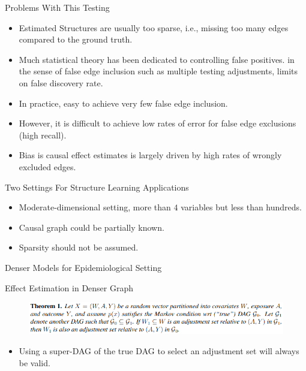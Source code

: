 \documentclass{beamer}
\begin{document}
\begin{frame}{Problems With This Testing}
	\begin{itemize}
		\item Estimated Structures are usually too sparse, i.e., missing too many edges compared to the ground truth.
		\item Much statistical theory has been dedicated to controlling false positives. in the sense of false edge inclusion such as multiple testing adjustments, limits on false discovery rate.
		\item In practice, easy to achieve very few false edge inclusion.
		\item However, it is difficult to achieve low rates of error for false edge exclusions (high recall).
		\item Bias is causal effect estimates is largely driven by high rates of wrongly excluded edges.
	\end{itemize}
\end{frame}

\begin{frame}{Two Settings For Structure Learning Applications}
	\begin{itemize}
		\item Moderate-dimensional setting, more than $ 4 $ variables but less than hundreds.
		\item Causal graph could be partially known.
		\item Sparsity should not be assumed.
	\end{itemize}
\end{frame}

\begin{frame}{Denser Models for Epidemiological Setting}
\end{frame}

\begin{frame}{Effect Estimation in Denser Graph}
	\begin{figure}
		\centering
		\includegraphics[scale=0.4]{imgs/theorem1.png}
	\end{figure}
	\begin{itemize}
		\item Using a super-DAG of the true DAG to select an adjustment set will always be valid.
	\end{itemize}
\end{frame}
\end{document}
